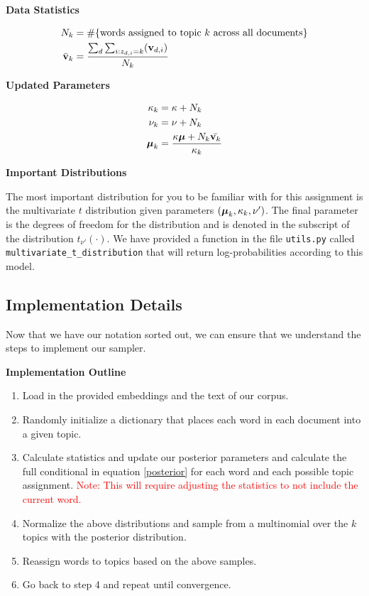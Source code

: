 \documentclass[11pt,addpoints,answers]{exam}
\numberwithin{equation}{section} %
\numberwithin{figure}{section} %
\numberwithin{table}{section} %
\begin{document}
\textbf{Data Statistics}

\begin{equation*}
    \begin{split}
        N_k &= \#\{ \text{words assigned to topic $k$ across all documents}\} \\
        \Bar{\mathbf{v}}_k &= \frac{\sum_{d}\sum_{i:z_{d, i}=k}(\mathbf{v}_{d, i})}{N_k} \\
    \end{split}
\end{equation*}

\textbf{Updated Parameters}

\begin{equation*}
    \begin{split}
        \kappa_k &= \kappa + N_k \\
        \nu_k &= \nu + N_k \\
        \boldsymbol \mu_k &= \frac{\kappa \boldsymbol \mu + N_k \Bar{\mathbf{v}_k}}{\kappa_k} \\
    \end{split}
\end{equation*}

\textbf{Important Distributions}

The most important distribution for you to be familiar with for this assignment is the multivariate $t$ distribution given parameters $(\boldsymbol \mu_k, \kappa_k, \nu')$. The final parameter is the degrees of freedom for the distribution and is denoted in the subscript of the distribution $t_{\nu'}(\cdot)$. We have provided a function in the file \lstinline{utils.py} called \lstinline{multivariate_t_distribution} that will return log-probabilities according to this model. 

\subsection{Implementation Details}

Now that we have our notation sorted out, we can ensure that we understand the steps to implement our sampler.

\textbf{Implementation Outline}

\begin{enumerate}
    \item Load in the provided embeddings and the text of our corpus.
    \item Randomly initialize a dictionary that places each word in each document into a given topic. 
    \item Calculate statistics and update our posterior parameters and calculate the full conditional in equation \ref{posterior} for each word and each possible topic assignment. \textcolor{red}{Note: This will require adjusting the statistics to not include the current word.} 
    \item Normalize the above distributions and sample from a multinomial over the $k$ topics with the posterior distribution.
    \item Reassign words to topics based on the above samples. 
    \item Go back to step 4 and repeat until convergence. 
\end{enumerate}
\end{document}

